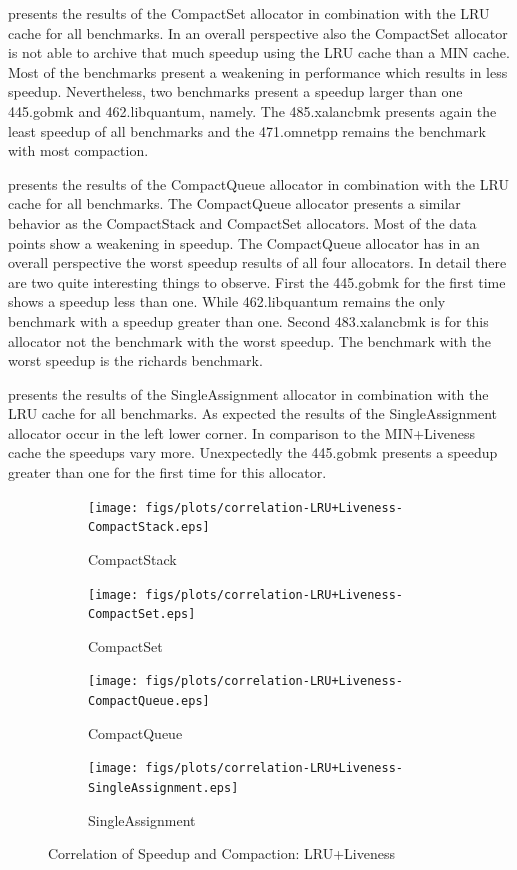 \documentclass[onecolumn, openright, master, english, signatures]{dbrgrptt}
\begin{document}
 presents the results of the CompactSet allocator in combination with the \ac{LRU} cache for all benchmarks. In an overall perspective also the CompactSet allocator is not able to archive that much speedup using the \ac{LRU} cache than a \ac{MIN} cache. Most of the benchmarks present a weakening in performance which results in less speedup. Nevertheless, two benchmarks present a speedup larger than one 445.gobmk and 462.libquantum, namely. The 485.xalancbmk presents again the least speedup of all benchmarks and the 471.omnetpp remains the benchmark with most compaction.

 presents the results of the CompactQueue allocator in combination with the \ac{LRU} cache for all benchmarks. The CompactQueue allocator presents a similar behavior as the CompactStack and CompactSet allocators. Most of the data points show a weakening in speedup. The CompactQueue allocator has in an overall perspective the worst speedup results of all four allocators. In detail there are two quite interesting things to observe. First the 445.gobmk for the first time shows a speedup less than one. While 462.libquantum remains the only benchmark with a speedup greater than one. Second 483.xalancbmk is for this allocator not the benchmark with the worst speedup. The benchmark with the worst speedup is the richards benchmark.

 presents the results of the SingleAssignment allocator in combination with the \ac{LRU} cache for all benchmarks. As expected the results of the SingleAssignment allocator occur in the left lower corner. In comparison to the \ac{MIN}+Liveness cache the speedups vary more. Unexpectedly the 445.gobmk presents a speedup greater than one for the first time for this allocator.

\begin{figure}[!ht]
  \begin{subfigure}[b]{0.5\textwidth}%
    \texttt{[image: figs/plots/correlation-LRU+Liveness-CompactStack.eps]}
    \caption{CompactStack}
    \label{fig:correlation-lru-liveness-compactstack}
  \end{subfigure}%
  \begin{subfigure}[b]{0.5\textwidth}%
    \texttt{[image: figs/plots/correlation-LRU+Liveness-CompactSet.eps]}
    \caption{CompactSet}
    \label{fig:correlation-lru-liveness-compactset}
  \end{subfigure}%
  \qquad
  \begin{subfigure}[b]{0.5\textwidth}%
    \texttt{[image: figs/plots/correlation-LRU+Liveness-CompactQueue.eps]}
    \caption{CompactQueue}
    \label{fig:correlation-lru-liveness-compactqueue}
  \end{subfigure}%
  \begin{subfigure}[b]{0.5\textwidth}%
    \texttt{[image: figs/plots/correlation-LRU+Liveness-SingleAssignment.eps]}
    \caption{SingleAssignment}
    \label{fig:correlation-lru-liveness-singleassignment}
  \end{subfigure}%
  \caption{Correlation of Speedup and Compaction: LRU+Liveness}
  \label{fig:correlation-lru-liveness}
\end{figure}
\end{document}
